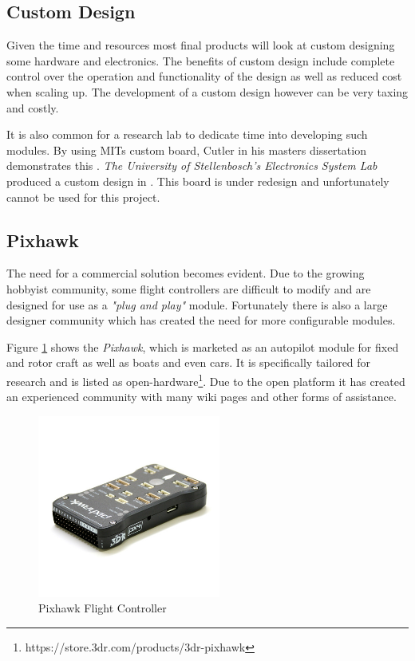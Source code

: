 			\subsection{Custom Design}
			Given the time and resources most final products will look at custom designing some hardware and electronics. The benefits of custom design include complete control over the operation and functionality of the design as well as reduced cost when scaling up. The development of a custom design however can be very taxing and costly.
		
			It is also common for a research lab to dedicate time into developing such modules. By using MITs custom board, Cutler in his masters dissertation demonstrates this \cite{How2012}. \textit{The University of Stellenbosch's Electronics System Lab} produced a custom design in . This board is under redesign and unfortunately cannot be used for this project.
			
			\subsection{Pixhawk}
			The need for a commercial solution becomes evident. Due to the growing hobbyist community, some flight controllers are difficult to modify and are designed for use as a \textit{"plug and play"} module. Fortunately there is also a large designer community which has created the need for more configurable modules.
			
			 Figure \ref{IM_Pixhawk} shows the \textit{Pixhawk}, which is marketed as an autopilot module for fixed and rotor craft as well as boats and even cars. It is specifically tailored for research and is listed as open-hardware\footnote{https://store.3dr.com/products/3dr-pixhawk}. Due to the open platform it has created an experienced community with many wiki pages and other forms of assistance.
			
			\begin{figure}[H]
				\centering
				\includegraphics[height = 6cm]{Images/System/Pixhawk.jpg}     
				\caption{Pixhawk Flight Controller}
				\label{IM_Pixhawk}
			\end{figure}
			
